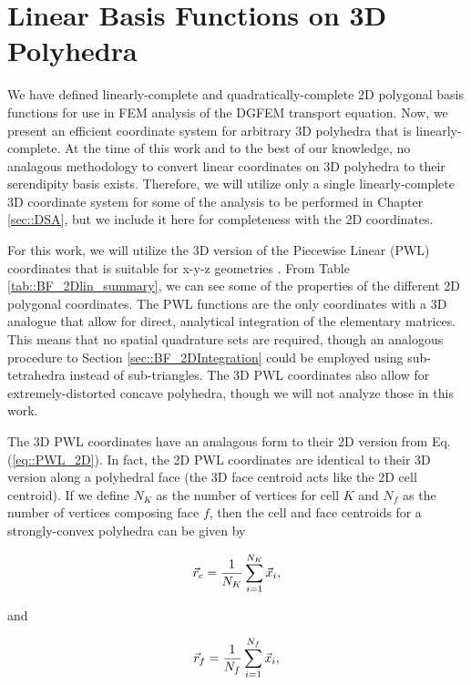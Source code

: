 \section{Linear Basis Functions on 3D Polyhedra}
\label{sec::BF_3DLinear}


We have defined linearly-complete and quadratically-complete 2D polygonal basis functions for use in FEM analysis of the DGFEM transport equation. Now, we present an efficient coordinate system for arbitrary 3D polyhedra that is linearly-complete. At the time of this work and to the best of our knowledge, no analagous methodology to convert linear coordinates on 3D polyhedra to their serendipity basis exists. Therefore, we will utilize only a single linearly-complete 3D coordinate system for some of the analysis to be performed in Chapter \ref{sec::DSA}, but we include it here for completeness with the 2D coordinates.

For this work, we will utilize the 3D version of the Piecewise Linear (PWL) coordinates that is suitable for x-y-z geometries \cite{bailey2008phd}. From Table \ref{tab::BF_2Dlin_summary}, we can see some of the properties of the different 2D polygonal coordinates. The PWL functions are the only coordinates with a 3D analogue that allow for direct, analytical integration of the elementary matrices. This means that no spatial quadrature sets are required, though an analogous procedure to Section \ref{sec::BF_2DIntegration} could be employed using sub-tetrahedra instead of sub-triangles. The 3D PWL coordinates also allow for extremely-distorted concave polyhedra, though we will not analyze those in this work.

The 3D PWL coordinates have an analagous form to their 2D version from Eq. (\ref{eq::PWL_2D}). In fact, the 2D PWL coordinates are identical to their 3D version along a polyhedral face (the 3D face centroid acts like the 2D cell centroid). If we define $N_K$ as the number of vertices for cell $K$ and $N_f$ as the number of vertices composing face $f$, then the cell and face centroids for a strongly-convex polyhedra can be given by

\begin{equation}
\label{eq::PWL_3D_cell_center}
	\vec{r}_{c} = \frac{1}{N_K} \sum\displaylimits_{i=1}^{N_K} \vec{x}_i ,
\end{equation}

\noindent and

\begin{equation}
\label{eq::PWL_3D_face_center}
	\vec{r}_{f} = \frac{1}{N_f} \sum\displaylimits_{i=1}^{N_f} \vec{x}_i ,
\end{equation}

